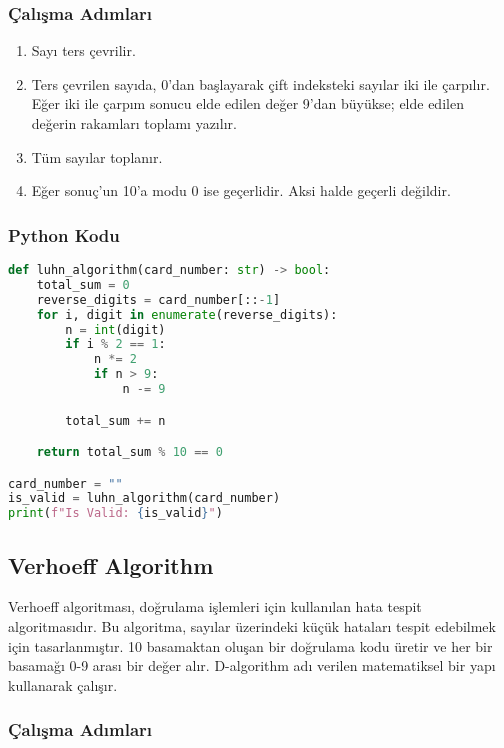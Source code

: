 \subsubsection{Çalışma Adımları}

\begin{enumerate}
    \item Sayı ters çevrilir.
    \item Ters çevrilen sayıda, 0'dan başlayarak çift indeksteki sayılar iki ile çarpılır. Eğer iki ile çarpım sonucu elde edilen değer 9'dan büyükse; elde edilen değerin rakamları toplamı yazılır.
    \item Tüm sayılar toplanır.
    \item Eğer sonuç'un 10'a modu 0 ise geçerlidir. Aksi halde geçerli değildir.
\end{enumerate}

\subsubsection{Python Kodu}

\begin{lstlisting}[language=Python]
def luhn_algorithm(card_number: str) -> bool:
    total_sum = 0
    reverse_digits = card_number[::-1]
    for i, digit in enumerate(reverse_digits):
        n = int(digit)
        if i % 2 == 1:
            n *= 2
            if n > 9:
                n -= 9

        total_sum += n

    return total_sum % 10 == 0

card_number = ""
is_valid = luhn_algorithm(card_number)
print(f"Is Valid: {is_valid}")
\end{lstlisting}

\newpage

\subsection{Verhoeff Algorithm}

Verhoeff algoritması, doğrulama işlemleri için kullanılan hata tespit algoritmasıdır. Bu algoritma, sayılar üzerindeki küçük hataları tespit edebilmek için tasarlanmıştır. 10 basamaktan oluşan bir doğrulama kodu üretir ve her bir basamağı 0-9 arası bir değer alır. D-algorithm adı verilen matematiksel bir yapı kullanarak çalışır.

\subsubsection{Çalışma Adımları}

